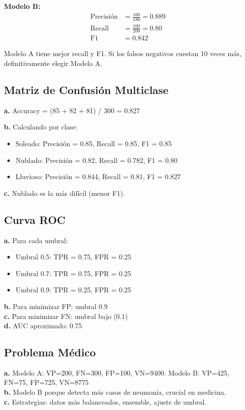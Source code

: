 \documentclass[12pt]{article}
\begin{document}
\textbf{Modelo B:}
\begin{align*}
\text{Precisión} &= \frac{160}{180} = 0.889 \\
\text{Recall} &= \frac{160}{200} = 0.80 \\
\text{F1} &= 0.842
\end{align*}

Modelo A tiene mejor recall y F1. Si los falsos negativos cuestan 10 veces más, definitivamente elegir Modelo A.

\subsection{Matriz de Confusión Multiclase}

\textbf{a.} Accuracy = (85 + 82 + 81) / 300 = 0.827

\textbf{b.} Calculando por clase:
\begin{itemize}
    \item Soleado: Precisión = 0.85, Recall = 0.85, F1 = 0.85
    \item Nublado: Precisión = 0.82, Recall = 0.782, F1 = 0.80
    \item Lluvioso: Precisión = 0.844, Recall = 0.81, F1 = 0.827
\end{itemize}

\textbf{c.} Nublado es la más difícil (menor F1).

\subsection{Curva ROC}

\textbf{a.} Para cada umbral:
\begin{itemize}
    \item Umbral 0.5: TPR = 0.75, FPR = 0.25
    \item Umbral 0.7: TPR = 0.75, FPR = 0.25
    \item Umbral 0.9: TPR = 0.25, FPR = 0.25
\end{itemize}

\textbf{b.} Para minimizar FP: umbral 0.9 \\
\textbf{c.} Para minimizar FN: umbral bajo (0.1) \\
\textbf{d.} AUC aproximado: 0.75

\subsection{Problema Médico}

\textbf{a.} Modelo A: VP=200, FN=300, FP=100, VN=9400. Modelo B: VP=425, FN=75, FP=725, VN=8775 \\
\textbf{b.} Modelo B porque detecta más casos de neumonía, crucial en medicina. \\
\textbf{c.} Estrategias: datos más balanceados, ensemble, ajuste de umbral.
\end{document}
